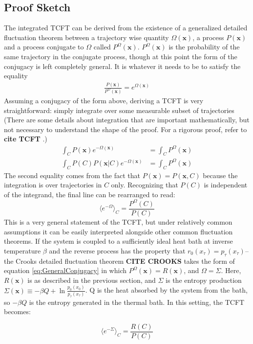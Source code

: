 \documentclass[paper=a4, fontsize=10pt]{article} %
\numberwithin{equation}{section} %
\numberwithin{figure}{section} %
\numberwithin{table}{section} %
\def\tbf #1{\textbf{#1} }
\def\avg#1{\langle #1 \rangle}
\def \x {\mathbf{x} }
\begin{document}
\subsection{Proof Sketch}
The integrated TCFT can be derived from the existence of a generalized detailed fluctuation theorem between a trajectory wise quantity $\Omega(\x)$, a process $P(\x)$  and a process conjugate to $\Omega$ called $P^\Omega(\x)$. $P^\Omega(\x)$ is the probability of the same trajectory in the conjugate process, though at this point the form of the conjugacy is left completely general. It is whatever it needs to be to satisfy the equality
\begin{align}\label{eq:GeneralConjugacy}
\frac{ P(\x)}{P^\Omega(\x)} = e^{\Omega(\x)}
\end{align}
Assuming a conjugacy of the form above, deriving a TCFT is very straightforward: simply integrate over some measurable subset of trajectories (There are some details about integration that are important mathematically, but not necessary to understand the shape of the proof. For a rigorous proof, refer to \tbf{cite TCFT}.)
\begin{align}
 \int_C P(\x) e^{-\Omega(\x)} &=  \int_C P^\Omega(\x)\\
 \int_C P(C)P(\x|C) e^{-\Omega(\x)} &= \int_C P^\Omega(\x) 
\end{align}
The second equality comes from the fact that $P(\x)=P(\x,C)$ because the integration is over trajectories in $C$ only. Recognizing that $P(C)$ is independent of the integrand, the final line can be rearranged to read:
\[  \avg{e^{-\Omega}}_{C}= \frac{P^\Omega(C)}{P(C)} \]
This is a very general statement of the TCFT, but under relatively common assumptions it can be easily interpreted alongside other common fluctuation theorems. If the system is coupled to a sufficiently ideal heat bath at inverse temperature $\beta$ and the reverse process has the property that $r_0(x_\tau) = p_\tau(x_\tau)$-- the Crooks detailed fluctuation theorem \tbf{CITE CROOKS} takes the form of equation \ref{eq:GeneralConjugacy} in which $P^\Omega(\x) = R(\x)$, and $\Omega=\Sigma$. Here, $R(\x)$ is as described in the previous section, and $\Sigma$ is the entropy production $\Sigma(\x) \equiv -\beta Q + \ln \frac{p_0(x_0)}{p_\tau(x_\tau)}$. Q is the heat absorbed by the system from the bath, so $-\beta Q$ is the entropy generated in the thermal bath. In this setting, the TCFT becomes:

\[  \avg{e^{-\Sigma}}_{C}= \frac{R(C)}{P(C)} \]
\end{document}
